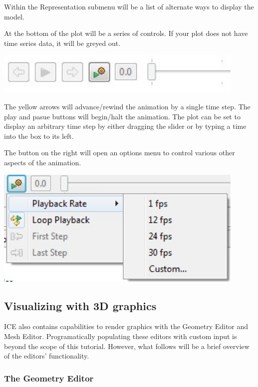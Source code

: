\documentclass{article}
\begin{document}
Within the Representation submenu will be a list of alternate ways to display
the model. 

At the bottom of the plot will be a series of controls. If your plot does not
have time series data, it will be greyed out. 

\begin{center}
\includegraphics[width=12cm]{images/TimeSliderWidget} 
\end{center}

The yellow arrows will advance/rewind the animation by a single time step. The
play and pasue buttons will begin/halt the animation. The plot can be set to
display an arbitrary time step by either dragging the slider or by typing a time
into the box to its left.

The button on the right will open an options menu to control various other
aspects of the animation.

\begin{center}
\includegraphics[width=12cm]{images/TimeSliderOptions}
\end{center}

\subsection{Visualizing with 3D graphics}

ICE also contains capabilities to render graphics with the Geometry Editor and
Mesh Editor. Programatically populating these editors with custom input is
beyond the scope of this tutorial. However, what follows will be a brief
overview of the editors' functionality.

\subsubsection{The Geometry Editor}
\end{document}
